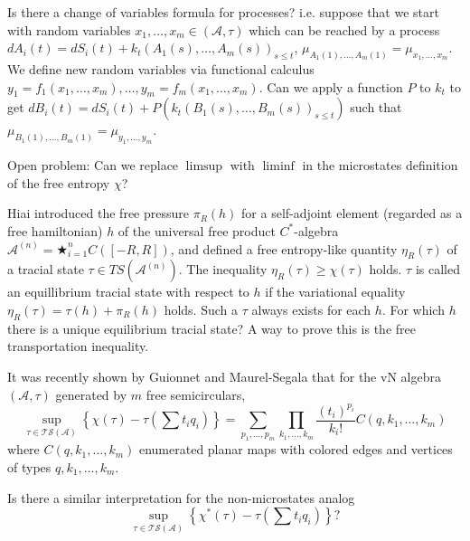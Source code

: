 \documentclass[12pt,letterpaper, reqno]{amsart}
\begin{document}
\begin{problem}
 Is there a change of variables formula for
processes? i.e. suppose that we start with random variables $x_{1},\ldots,x_{m}\in(\mathcal{A},\tau)$
which can be reached by a process $dA_{i}(t)=dS_{i}(t)+k_{t}(A_{1}(s),\ldots,A_{m}(s))_{s\leq t}$,
$\mu_{A_{1}(1),\ldots,A_{m}(1)}=\mu_{x_{1},\ldots,x_{m}}$. We define
new random variables via functional calculus $y_{1}=f_{1}(x_{1},\ldots,x_{m}),\ldots,y_{m}=f_{m}(x_{1},\ldots,x_{m})$.
Can we apply a function $P$ to $k_{t}$ to get $dB_{i}(t)=dS_{i}(t)+P(k_{t}(B_{1}(s),\ldots,B_{m}(s))_{s\leq t})$
such that $\mu_{B_{1}(1),\ldots,B_{m}(1)}=\mu_{y_{1},\ldots,y_{m}}$.
\end{problem}


\begin{problem} Open problem:  Can we replace $\limsup$ with $\liminf$
in the microstates definition of the free entropy $\chi$?
\end{problem}

\begin{problem}
Hiai introduced the free pressure $\pi_R(h)$ for a self-adjoint element
(regarded as a free hamiltonian) $h$ of the universal free product
$C^*$-algebra $\mathcal{A}^{(n)}=\bigstar_{i=1}^nC([-R,R])$, and defined
a free entropy-like quantity $\eta_R(\tau)$ of a tracial state
$\tau\in TS(\mathcal{A}^{(n)})$. The inequality $\eta_R(\tau)\ge\chi(\tau)$
holds. $\tau$ is called an equillibrium tracial state with respect to $h$
if the variational equality $\eta_R(\tau)=\tau(h)+\pi_R(h)$ holds. Such a
$\tau$ always exists for each $h$. For which $h$ there is a unique equilibrium
tracial state? A way to prove this is the free transportation inequality.
\end{problem}

\begin{problemblock}

It was recently shown by Guionnet and Maurel-Segala
that for the vN algebra $(\mathcal{A},\tau)$ generated by $m$ free
semicirculars, \[
\sup_{\tau\in\mathcal{TS}(\mathcal{A})}\left\{ \chi(\tau)-\tau(\sum t_{i}q_{i})\right\} =\sum_{p_{1},\ldots,p_{m}}\prod_{k_{1},\ldots,k_{m}}\frac{(t_{i})^{p_{i}}}{k_{i}!}C(q,k_{1},\ldots,k_{m})\]
 where $C(q,k_{1},\ldots,k_{m})$ enumerated planar maps with colored
edges and vertices of types $q,k_{1},\ldots,k_{m}$.

\begin{problem}
Is there a similar
interpretation for the non-microstates analog \[
\sup_{\tau\in\mathcal{TS}(\mathcal{A})}\left\{ \chi^{*}(\tau)-\tau(\sum t_{i}q_{i})\right\} \textrm{?}\]\end{problem}

\end{problemblock}
\end{document}
